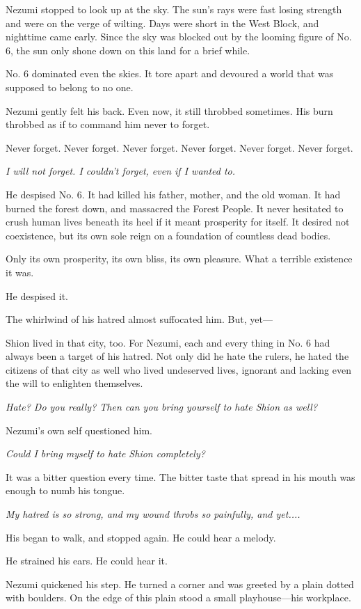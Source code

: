 Nezumi stopped to look up at the sky. The sun's rays were fast losing
strength and were on the verge of wilting. Days were short in the West
Block, and nighttime came early. Since the sky was blocked out by the
looming figure of No. 6, the sun only shone down on this land for a
brief while.

No. 6 dominated even the skies. It tore apart and devoured a world that
was supposed to belong to no one.

Nezumi gently felt his back. Even now, it still throbbed sometimes. His
burn throbbed as if to command him never to forget.

Never forget. Never forget. Never forget. Never forget. Never forget.
Never forget.

\emph{I will not forget. I couldn't forget, even if I wanted to.}

He despised No. 6. It had killed his father, mother, and the old woman.
It had burned the forest down, and massacred the Forest People. It never
hesitated to crush human lives beneath its heel if it meant prosperity
for itself. It desired not coexistence, but its own sole reign on a
foundation of countless dead bodies.

Only its own prosperity, its own bliss, its own pleasure. What a
terrible existence it was.

He despised it.

The whirlwind of his hatred almost suffocated him. But, yet---

Shion lived in that city, too. For Nezumi, each and every thing in No. 6
had always been a target of his hatred. Not only did he hate the rulers,
he hated the citizens of that city as well who lived undeserved lives,
ignorant and lacking even the will to enlighten themselves.

\emph{Hate? Do you really? Then can you bring yourself to hate Shion as well?}

Nezumi's own self questioned him.

\emph{Could I bring myself to hate Shion completely?}

It was a bitter question every time. The bitter taste that spread in his
mouth was enough to numb his tongue.

\emph{My hatred is so strong, and my wound throbs so painfully, and yet....}

His began to walk, and stopped again. He could hear a melody.~

He strained his ears. He could hear it.

Nezumi quickened his step. He turned a corner and was greeted by a plain
dotted with boulders. On the edge of this plain stood a small
playhouse---his workplace.

